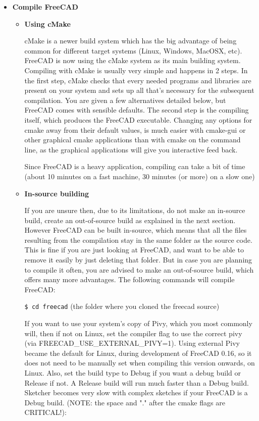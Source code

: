 \begin{itemize}
\item
\textbf{Compile FreeCAD}

\begin{itemize}
\item
\textbf{Using cMake}

cMake is a newer build system which has the big advantage of being common for different target systems (Linux, Windows, MacOSX, etc). FreeCAD is now using the cMake system as its main building system. Compiling with cMake is usually very simple and happens in 2 steps. In the first step, cMake checks that every needed programs and libraries are present on your system and sets up all that's necessary for the subsequent compilation. You are given a few alternatives detailed below, but FreeCAD comes with sensible defaults. The second step is the compiling itself, which produces the FreeCAD executable. Changing any options for cmake away from their default values, is much easier with cmake-gui or other graphical cmake applications than with cmake on the command line, as the graphical applications will give you interactive feed back.

Since FreeCAD is a heavy application, compiling can take a bit of time (about 10 minutes on a fast machine, 30 minutes (or more) on a slow one)

\item
\textbf{In-source building}

If you are unsure then, due to its limitations, do not make an in-source build, create an out-of-source build as explained in the next section. However FreeCAD can be built in-source, which means that all the files resulting from the compilation stay in the same folder as the source code. This is fine if you are just looking at FreeCAD, and want to be able to remove it easily by just deleting that folder. But in case you are planning to compile it often, you are advised to make an out-of-source build, which offers many more advantages. The following commands will compile FreeCAD:

\texttt{\$ cd freecad} (the folder where you cloned the freecad source)

If you want to use your system's copy of Pivy, which you most commonly will, then if not on Linux, set the compiler flag to use the correct pivy (via FREECAD\_USE\_EXTERNAL\_PIVY=1). Using external Pivy became the default for Linux, during development of FreeCAD 0.16, so it does not need to be manually set when compiling this version onwards, on Linux. Also, set the build type to Debug if you want a debug build or Release if not. A Release build will run much faster than a Debug build. Sketcher becomes very slow with complex sketches if your FreeCAD is a Debug build. (NOTE: the space and "." after the cmake flags are CRITICAL!):


\end{itemize}
\end{itemize}
